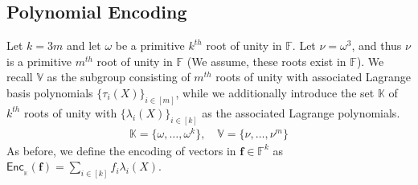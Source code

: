 \documentclass[sigconf]{acmart}
\renewcommand{\vec}{\mathbf} %
\newcommand{\enc}[2]{\mathsf{Enc}_{{}_{#2}}(\vec{#1})}
\newcommand{\setH}{\mathbb{K}}
\newcommand{\setV}{\mathbb{V}}
\newcommand{\F}{\mathbb{F}}
\newcommand{\LRAM}[3]{\ensuremath{\mathsf{LRAM}_{\mathcal{#1},#2,#3}}}
\begin{document}
		\subsection{Polynomial Encoding}\label{subsec:poly-encoding}
		Let $k=3m$ and let $\omega$ be a primitive $k^{th}$ root of unity in $\F$.
		Let $\nu=\omega^3$, and thus $\nu$ is a primitive $m^{th}$ root of unity in $\F$ (We assume, these roots exist in $\F$).
		We recall $\setV$ as the subgroup consisting of $m^{th}$ roots of unity with associated Lagrange basis polynomials
		$\{\tau_i(X)\}_{i\in [m]}$, while we additionally introduce the set $\setH$ of $k^{th}$ roots of unity with
		$\{\lambda_i(X)\}_{i\in [k]}$ as the associated Lagrange polynomials.
		\begin{gather}\label{eq:interpolation-sets}
			\setH = \{\omega,\ldots,\omega^k\},\quad \setV = \{\nu,\ldots,\nu^m\}
		\end{gather}
		As before, we define the encoding of vectors in $\vec{f}\in \F^k$ as $\enc{f}{\setH}=\sum_{i\in [k]}f_i\lambda_i(X)$.
\end{document}
